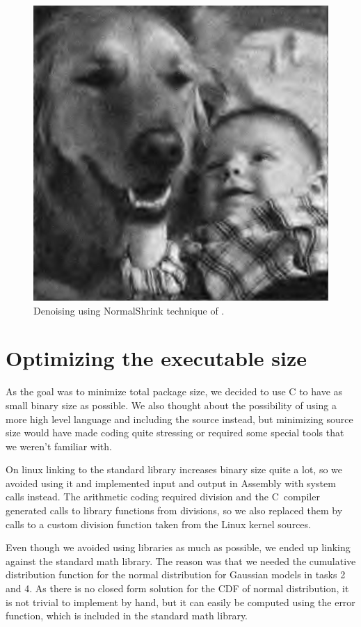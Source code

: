 \documentclass{article}
\begin{document}
\begin{figure}
    \centering
    \includegraphics[scale=0.4]{kd_normalshrink}
    \caption{Denoising using NormalShrink technique of \cite{ksc02}.}\label{fig:normalsht}
\end{figure}

\section{Optimizing the executable size}

As the goal was to minimize total package size, we decided to use C to have as small binary size as possible.
We also thought about the possibility of using a more high level language and including the source instead, but minimizing source size would have made coding quite stressing or required some special tools that we weren't familiar with.

On linux linking to the standard library increases binary size quite a lot,
so we avoided using it and implemented input and output in Assembly with system calls instead.
The arithmetic coding required division and the C~compiler generated calls to library functions from divisions, so we also replaced them by calls to a custom division function taken from the Linux kernel sources.

Even though we avoided using libraries as much as possible, we ended up linking against the standard math library.
The reason was that we needed the cumulative distribution function for the normal distribution for Gaussian models in tasks 2 and 4.
As there is no closed form solution for the CDF of normal distribution, it is not trivial to implement by hand, but it can easily be computed using the error function, which is included in the standard math library.





\end{document}
